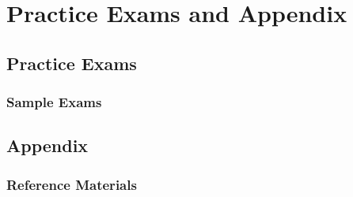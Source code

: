 \documentclass[12pt]{book}
\begin{document}
\part{Practice Exams and Appendix}
\chapter{Practice Exams}
\section{Sample Exams}

\chapter{Appendix}
\section{Reference Materials}


\end{document}
